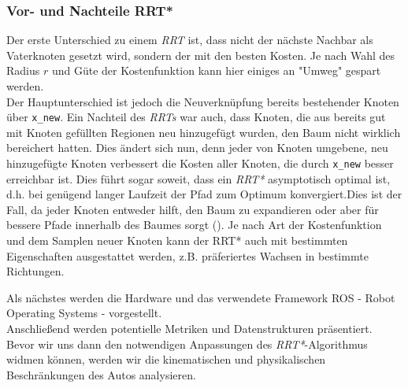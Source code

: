 \subsubsection{Vor- und Nachteile RRT*}
Der erste Unterschied zu einem \textit{RRT} ist, dass nicht der nächste Nachbar als Vaterknoten gesetzt wird, sondern der mit den besten Kosten. Je nach Wahl des Radius $r$ und Güte der Kostenfunktion kann hier einiges an "Umweg" gespart werden. \\
Der Hauptunterschied ist jedoch die Neuverknüpfung bereits bestehender Knoten über \verb|x_new|. Ein Nachteil des \textit{RRTs} war auch, dass Knoten, die aus bereits gut mit Knoten gefüllten Regionen neu hinzugefügt wurden, den Baum nicht wirklich bereichert hatten. Dies ändert sich nun, denn jeder von Knoten umgebene, neu hinzugefügte Knoten verbessert die Kosten aller Knoten, die durch \verb|x_new| besser erreichbar ist. Dies führt sogar soweit, dass ein \textit{RRT*} asymptotisch optimal ist, d.h. bei genügend langer Laufzeit der Pfad zum Optimum konvergiert.Dies ist der Fall, da jeder Knoten entweder hilft, den Baum zu expandieren oder aber für bessere Pfade innerhalb des Baumes sorgt (\citep[vgl. Kapitel 5 in][]{KaFra10}). Je nach Art der Kostenfunktion und dem Samplen neuer Knoten kann der RRT* auch mit bestimmten Eigenschaften ausgestattet werden, z.B. präferiertes Wachsen in bestimmte Richtungen.

Als nächstes werden die Hardware und das verwendete Framework ROS - Robot Operating Systems - vorgestellt. \\
Anschließend werden potentielle Metriken und Datenstrukturen präsentiert.
Bevor wir uns dann den notwendigen Anpassungen des \textit{RRT*}-Algorithmus widmen können, werden wir die kinematischen und physikalischen Beschränkungen des Autos analysieren.
